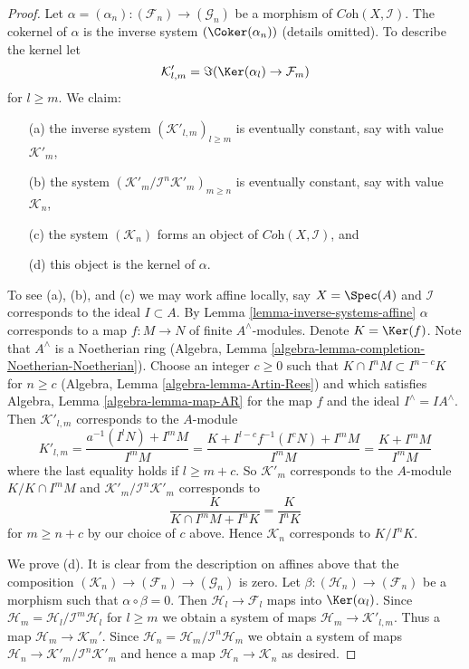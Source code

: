 \begin{proof}
Let $\alpha =(\alpha_n) : (\mathcal{F}_n) \to (\mathcal{G}_n)$ be a morphism of
$\textit{Coh}(X, \mathcal{I})$. The cokernel of $\alpha$ is the inverse system
$(\Coker(\alpha_n))$ (details omitted). To describe the kernel let
$$
\mathcal{K}'_{l, m} = \Im(\Ker(\alpha_l) \to \mathcal{F}_m)
$$
for $l \geq m$.
We claim:
\begin{enumerate}
\item[(a)] the inverse system $(\mathcal{K}'_{l, m})_{l \geq m}$ is
eventually constant, say with value $\mathcal{K}'_m$,
\item[(b)] the system $(\mathcal{K}'_m/\mathcal{I}^n\mathcal{K}'_m)_{m \geq n}$
is eventually constant, say with value $\mathcal{K}_n$,
\item[(c)] the system $(\mathcal{K}_n)$ forms an object of
$\textit{Coh}(X, \mathcal{I})$, and
\item[(d)] this object is the kernel of $\alpha$.
\end{enumerate}
To see (a), (b), and (c) we may work affine locally, say $X = \Spec(A)$
and $\mathcal{I}$ corresponds to the ideal $I \subset A$. By
Lemma \ref{lemma-inverse-systems-affine}
$\alpha$ corresponds to a map $f : M \to N$ of finite $A^\wedge$-modules.
Denote $K = \Ker(f)$. Note that $A^\wedge$ is a Noetherian
ring (Algebra, Lemma \ref{algebra-lemma-completion-Noetherian-Noetherian}).
Choose an integer $c \geq 0$ such that
$K \cap I^n M \subset I^{n - c}K$ for $n \geq c$
(Algebra, Lemma \ref{algebra-lemma-Artin-Rees})
and which satisfies Algebra, Lemma \ref{algebra-lemma-map-AR}
for the map $f$ and the ideal $I^\wedge = IA^\wedge$. Then
$\mathcal{K}'_{l, m}$ corresponds to the $A$-module
$$
K'_{l, m} = \frac{a^{-1}(I^lN) + I^mM}{I^mM} =
\frac{K + I^{l - c}f^{-1}(I^cN) + I^mM}{I^mM} =
\frac{K + I^mM}{I^mM}
$$
where the last equality holds if $l \geq m + c$. So $\mathcal{K}'_m$
corresponds to the $A$-module $K/K \cap I^mM$ and
$\mathcal{K}'_m/\mathcal{I}^n\mathcal{K}'_m$ corresponds to
$$
\frac{K}{K \cap I^mM + I^nK} = \frac{K}{I^nK}
$$
for $m \geq n + c$ by our choice of $c$ above. Hence $\mathcal{K}_n$
corresponds to $K/I^nK$.

\medskip\noindent
We prove (d). It is clear from the description on affines above that
the composition $(\mathcal{K}_n) \to (\mathcal{F}_n) \to (\mathcal{G}_n)$
is zero. Let $\beta : (\mathcal{H}_n) \to (\mathcal{F}_n)$
be a morphism such that $\alpha \circ \beta = 0$. Then
$\mathcal{H}_l \to \mathcal{F}_l$ maps into $\Ker(\alpha_l)$.
Since $\mathcal{H}_m = \mathcal{H}_l/\mathcal{I}^m\mathcal{H}_l$
for $l \geq m$ we obtain a system of maps
$\mathcal{H}_m \to \mathcal{K}'_{l, m}$. Thus a map
$\mathcal{H}_m \to \mathcal{K}_m'$. Since
$\mathcal{H}_n = \mathcal{H}_m/\mathcal{I}^n\mathcal{H}_m$ we obtain
a system of maps $\mathcal{H}_n \to \mathcal{K}'_m/\mathcal{I}^n\mathcal{K}'_m$
and hence a map $\mathcal{H}_n \to \mathcal{K}_n$ as desired.


\end{proof}
